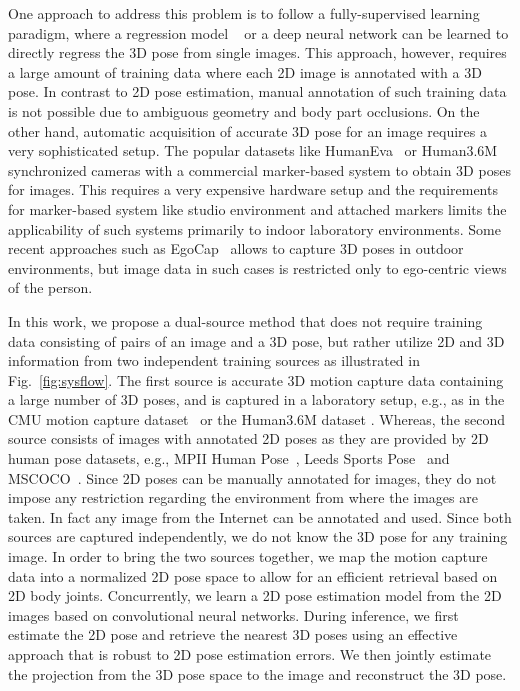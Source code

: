 \documentclass[10pt,journal,compsoc]{IEEEtran}
\makeatletter
\newcommand*{\eg}{e.g.\@\xspace}
\makeatother
\begin{document}
One approach to address this problem is to follow a fully-supervised learning paradigm, where a regression model ~\cite{Bo-2010,h36m_pami, Ilya_2014,ics-cvpr14,Agarwal:2006, bo2008fast,LiC14, tekin2015predicting}
or a deep neural network \cite{Sijin2015iccv,tekin2016structured, tekin2016fusing, zhou2016deep, Moreno_arxiv2016, popa2017CVPRmultitask} 
can be learned to directly regress the 3D pose from single images. This approach, however, requires a large amount of training data where each
2D image is annotated with a 3D pose. In contrast to 2D pose estimation, manual annotation of such training data
is not possible due to ambiguous geometry and body part occlusions. On the other hand, automatic acquisition of accurate 3D pose
for an image requires a very sophisticated setup. The popular datasets like HumanEva~\cite{Sigal_2010} or Human3.6M~\cite{h36m_pami} 
synchronized cameras with a commercial marker-based system to obtain 3D poses for images. This requires a very expensive hardware setup and 
the requirements for marker-based system like studio environment and attached markers limits the applicability of such systems primarily
to indoor laboratory environments. Some recent approaches such as EgoCap~\cite{rhodin2016egocap} allows to capture 3D poses in outdoor environments, but image data in such cases is 
restricted only to ego-centric views of the person. 

In this work, we propose a dual-source method that does not require training data consisting of pairs of an image and a 3D pose, but rather utilize 2D and
3D information from two independent training sources as illustrated in Fig.~\ref{fig:sysflow}. 
The first source is accurate 3D motion capture data containing a large number of 3D poses, and is captured in a laboratory setup, 
e.g., as in the CMU motion capture dataset~\cite{cmu_mocap} or the Human3.6M dataset \cite{h36m_pami}. Whereas, the second source consists of images with annotated 2D poses as they are provided by 2D human pose datasets, \eg, MPII Human Pose~\cite{andriluka14cvpr},
Leeds Sports Pose~\cite{Johnson10} and MSCOCO~\cite{lin2014microsoft}. 
Since 2D poses can be manually annotated for images, they do not impose any restriction regarding the environment from where the 
images are taken. In fact any image from the Internet can be annotated and used. 
Since both sources are captured independently, we do not know the 3D pose for any training image.
In order to bring the two sources together, we map the motion capture data into a normalized 2D pose space to allow for an efficient retrieval based on 2D body joints. Concurrently, we learn a 2D pose estimation model from the 2D images based on convolutional neural networks. During inference, we first estimate the 2D pose and retrieve the nearest 3D poses using an effective approach that is robust 
to 2D pose estimation errors. We then jointly estimate the projection from the 3D pose space to the image and reconstruct the 3D pose. 
\end{document}
